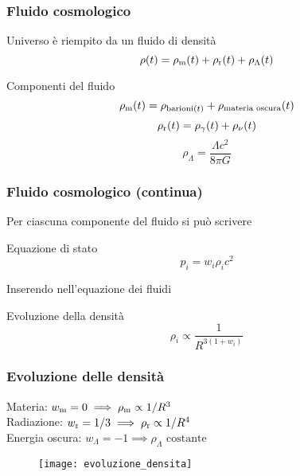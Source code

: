 \begin{frame}
  \frametitle{Fluido cosmologico}
  Universo è riempito da un fluido di densità
  \begin{equation*}
    \rho(t) = \rho_{\textup{m}}(t) + \rho_{\textup{r}}(t) + \rho_\Lambda(t)
  \end{equation*}
  \pause{}
  \begin{block}{Componenti del fluido}
    \begin{equation*}
      \rho_{\textup{m}}(t) = \rho_{\textup{barioni}(t)} + \rho_{\textup{materia
          oscura}}(t)
    \end{equation*}
    \pause{}
    \begin{equation*}
      \rho_{\textup{r}}(t) = \rho_\gamma(t) + \rho_\nu(t)
    \end{equation*}
    \pause{}
    \begin{equation*}
      \rho_\Lambda = \frac{\Lambda c^2}{8\pi G}
    \end{equation*}
  \end{block}
\end{frame}

\begin{frame}
  \frametitle{Fluido cosmologico (continua)}
  Per ciascuna componente del fluido si può scrivere
  \begin{block}{Equazione di stato}
    \begin{equation*}
      p_i = w_i \rho_i c^2
    \end{equation*}
  \end{block}
  \pause{}
  Inserendo nell'equazione dei fluidi
  \begin{block}{Evoluzione della densità}
    \begin{equation*}
      \rho_i \propto \frac{1}{R^{3(1+w_i)}}
    \end{equation*}
  \end{block}
\end{frame}

\begin{frame}
  \frametitle{Evoluzione delle densità}
  Materia: $w_{\textup{m}} = 0 \implies \rho_{\textup{m}} \propto 1/R^3$ \\
  Radiazione: $w_{\textup{r}} = 1/3 \implies \rho_{\textup{r}} \propto 1/R^4$ \\
  Energia oscura: $w_\Lambda = -1 \implies \rho_\Lambda \text{ costante}$
  \begin{figure}
    \centering
    \texttt{[image: evoluzione\_densita]}
  \end{figure}
\end{frame}

